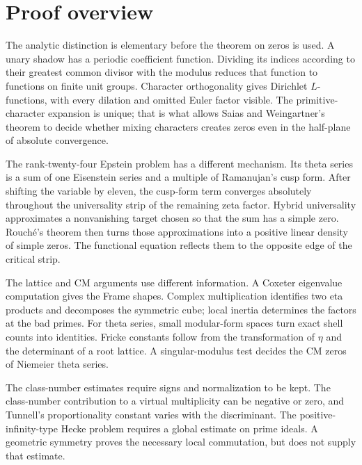 \documentclass[11pt]{amsart}
\theoremstyle{definition}
\theoremstyle{remark}
\begin{document}
\section{Proof overview}
The analytic distinction is elementary before the theorem on zeros is
used. A unary shadow has a periodic coefficient function. Dividing its
indices according to their greatest common divisor with the modulus
reduces that function to functions on finite unit groups. Character
orthogonality gives Dirichlet $L$-functions, with every dilation and
omitted Euler factor visible. The primitive-character expansion is unique;
that is what allows Saias and Weingartner's theorem to decide whether
mixing characters creates zeros even in the half-plane of absolute
convergence.

The rank-twenty-four Epstein problem has a different mechanism.
Its theta series is a sum of one Eisenstein series and a multiple of
Ramanujan's cusp form. After shifting the variable by eleven, the
cusp-form term converges absolutely throughout the universality strip
of the remaining zeta factor. Hybrid universality approximates a
nonvanishing target chosen so that the sum has a simple zero.
Rouch\'e's theorem then turns those approximations into a positive
linear density of simple zeros. The functional equation reflects
them to the opposite edge of the critical strip.

The lattice and CM arguments use different information. A Coxeter
eigenvalue computation gives the Frame shapes. Complex multiplication
identifies two eta products and decomposes the symmetric cube;
local inertia determines the factors at the bad primes. For theta series,
small modular-form spaces turn exact shell counts into identities.
Fricke constants follow from the transformation of $\eta$ and the
determinant of a root lattice. A singular-modulus test decides the CM
zeros of Niemeier theta series.

The class-number estimates require signs and normalization to be kept.
The class-number contribution to a virtual multiplicity can be negative
or zero, and Tunnell's proportionality constant varies with the
discriminant. The positive-infinity-type Hecke problem requires a global
estimate on prime ideals. A geometric symmetry proves the necessary local
commutation, but does not supply that estimate.










\end{document}
